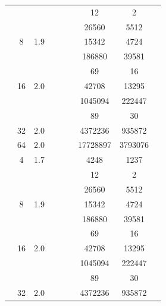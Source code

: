 \begin{table}[htbp]
\begin{tabular}{l S[table-format=3.0] S[table-format=4.1] l S[table-format=6.0] S[table-format=6.0] S[table-format=6.0] S[table-format=5.0] S[table-format=2.0]}
     &  &  &  & {\text{---}} & {\text{---}} & 12 & 2 & {\text{---}} \\
     &  &  &  & {\text{---}} & {\text{---}} & 26560 & 5512 & {\text{---}} \\
     & 8 & 1.9 &  & {\text{---}} & {\text{---}} & 15342 & 4724 & {\text{---}} \\
     &  &  &  & {\text{---}} & {\text{---}} & 186880 & 39581 & {\text{---}} \\
     &  &  &  & {\text{---}} & {\text{---}} & 69 & 16 & {\text{---}} \\
     & 16 & 2.0 &  & {\text{---}} & {\text{---}} & 42708 & 13295 & {\text{---}} \\
     &  &  &  & {\text{---}} & {\text{---}} & 1045094 & 222447 & {\text{---}} \\
     &  &  &  & {\text{---}} & {\text{---}} & 89 & 30 & {\text{---}} \\
     & 32 & 2.0 &  & {\text{---}} & {\text{---}} & 4372236 & 935872 & {\text{---}} \\
     & 64 & 2.0 &  & {\text{---}} & {\text{---}} & 17728897 & 3793076 & {\text{---}} \\
    \midrule
     & 4 & 1.7 &  & {\text{---}} & {\text{---}} & 4248 & 1237 & {\text{---}} \\
     &  &  &  & {\text{---}} & {\text{---}} & 12 & 2 & {\text{---}} \\
     &  &  &  & {\text{---}} & {\text{---}} & 26560 & 5512 & {\text{---}} \\
     & 8 & 1.9 &  & {\text{---}} & {\text{---}} & 15342 & 4724 & {\text{---}} \\
     &  &  &  & {\text{---}} & {\text{---}} & 186880 & 39581 & {\text{---}} \\
     &  &  &  & {\text{---}} & {\text{---}} & 69 & 16 & {\text{---}} \\
     & 16 & 2.0 &  & {\text{---}} & {\text{---}} & 42708 & 13295 & {\text{---}} \\
     &  &  &  & {\text{---}} & {\text{---}} & 1045094 & 222447 & {\text{---}} \\
     &  &  &  & {\text{---}} & {\text{---}} & 89 & 30 & {\text{---}} \\
     & 32 & 2.0 &  & {\text{---}} & {\text{---}} & 4372236 & 935872 & {\text{---}} \\

\end{tabular}
\end{table}
